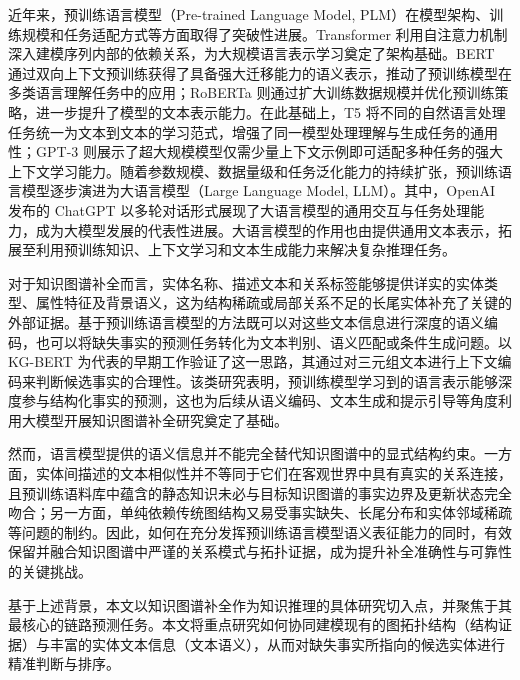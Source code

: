 近年来，预训练语言模型（Pre-trained Language Model, PLM）在模型架构、训练规模和任务适配方式等方面取得了突破性进展。Transformer 利用自注意力机制深入建模序列内部的依赖关系，为大规模语言表示学习奠定了架构基础\cite{vaswani2017attention}。BERT 通过双向上下文预训练获得了具备强大迁移能力的语义表示，推动了预训练模型在多类语言理解任务中的应用\cite{devlin2019bert}；RoBERTa 则通过扩大训练数据规模并优化预训练策略，进一步提升了模型的文本表示能力\cite{liu2019roberta}。在此基础上，T5 将不同的自然语言处理任务统一为文本到文本的学习范式，增强了同一模型处理理解与生成任务的通用性\cite{raffel2020t5}；GPT-3 则展示了超大规模模型仅需少量上下文示例即可适配多种任务的强大上下文学习能力\cite{brown2020gpt3}。随着参数规模、数据量级和任务泛化能力的持续扩张，预训练语言模型逐步演进为大语言模型（Large Language Model, LLM）。其中，OpenAI 发布的 ChatGPT 以多轮对话形式展现了大语言模型的通用交互与任务处理能力，成为大模型发展的代表性进展\cite{openai2022chatgpt}。大语言模型的作用也由提供通用文本表示，拓展至利用预训练知识、上下文学习和文本生成能力来解决复杂推理任务。

对于知识图谱补全而言，实体名称、描述文本和关系标签能够提供详实的实体类型、属性特征及背景语义，这为结构稀疏或局部关系不足的长尾实体补充了关键的外部证据。基于预训练语言模型的方法既可以对这些文本信息进行深度的语义编码，也可以将缺失事实的预测任务转化为文本判别、语义匹配或条件生成问题。以 KG-BERT 为代表的早期工作验证了这一思路，其通过对三元组文本进行上下文编码来判断候选事实的合理性\cite{yao2019kgbert}。该类研究表明，预训练模型学习到的语言表示能够深度参与结构化事实的预测，这也为后续从语义编码、文本生成和提示引导等角度利用大模型开展知识图谱补全研究奠定了基础。

然而，语言模型提供的语义信息并不能完全替代知识图谱中的显式结构约束。一方面，实体间描述的文本相似性并不等同于它们在客观世界中具有真实的关系连接，且预训练语料库中蕴含的静态知识未必与目标知识图谱的事实边界及更新状态完全吻合；另一方面，单纯依赖传统图结构又易受事实缺失、长尾分布和实体邻域稀疏等问题的制约。因此，如何在充分发挥预训练语言模型语义表征能力的同时，有效保留并融合知识图谱中严谨的关系模式与拓扑证据，成为提升补全准确性与可靠性的关键挑战。

基于上述背景，本文以知识图谱补全作为知识推理的具体研究切入点，并聚焦于其最核心的链路预测任务。本文将重点研究如何协同建模现有的图拓扑结构（结构证据）与丰富的实体文本信息（文本语义），从而对缺失事实所指向的候选实体进行精准判断与排序。


